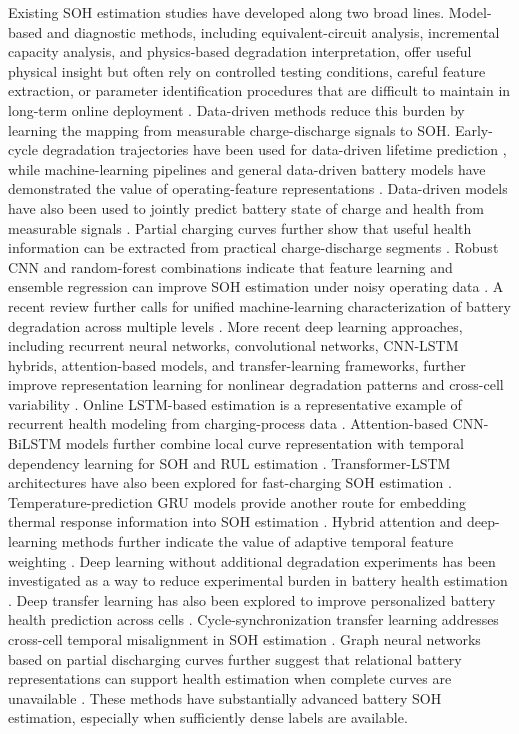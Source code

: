 \documentclass[a4paper,fleqn]{cas-dc}
\begin{document}
Existing SOH estimation studies have developed along two broad lines. Model-based and diagnostic methods, including equivalent-circuit analysis, incremental capacity analysis, and physics-based degradation interpretation, offer useful physical insight but often rely on controlled testing conditions, careful feature extraction, or parameter identification procedures that are difficult to maintain in long-term online deployment \cite{dubarry2022best}. Data-driven methods reduce this burden by learning the mapping from measurable charge-discharge signals to SOH. Early-cycle degradation trajectories have been used for data-driven lifetime prediction \cite{severson2019data}, while machine-learning pipelines and general data-driven battery models have demonstrated the value of operating-feature representations \cite{roman2021machine}. Data-driven models have also been used to jointly predict battery state of charge and health from measurable signals \cite{ng2020predicting}. Partial charging curves further show that useful health information can be extracted from practical charge-discharge segments \cite{lyu2021partial}. Robust CNN and random-forest combinations indicate that feature learning and ensemble regression can improve SOH estimation under noisy operating data \cite{yang2022robust}. A recent review further calls for unified machine-learning characterization of battery degradation across multiple levels \cite{li2022towards}. More recent deep learning approaches, including recurrent neural networks, convolutional networks, CNN-LSTM hybrids, attention-based models, and transfer-learning frameworks, further improve representation learning for nonlinear degradation patterns and cross-cell variability \cite{hochreiter1997long}. Online LSTM-based estimation is a representative example of recurrent health modeling from charging-process data \cite{liu2023online}. Attention-based CNN-BiLSTM models further combine local curve representation with temporal dependency learning for SOH and RUL estimation \cite{zhu2022attention}. Transformer-LSTM architectures have also been explored for fast-charging SOH estimation \cite{fan2023online}. Temperature-prediction GRU models provide another route for embedding thermal response information into SOH estimation \cite{chen2022state}. Hybrid attention and deep-learning methods further indicate the value of adaptive temporal feature weighting \cite{zhao2023state}. Deep learning without additional degradation experiments has been investigated as a way to reduce experimental burden in battery health estimation \cite{lu2023deep}. Deep transfer learning has also been explored to improve personalized battery health prediction across cells \cite{ma2022real}. Cycle-synchronization transfer learning addresses cross-cell temporal misalignment in SOH estimation \cite{zhou2022transfer}. Graph neural networks based on partial discharging curves further suggest that relational battery representations can support health estimation when complete curves are unavailable \cite{zhou2024graph}. These methods have substantially advanced battery SOH estimation, especially when sufficiently dense labels are available.
\end{document}
